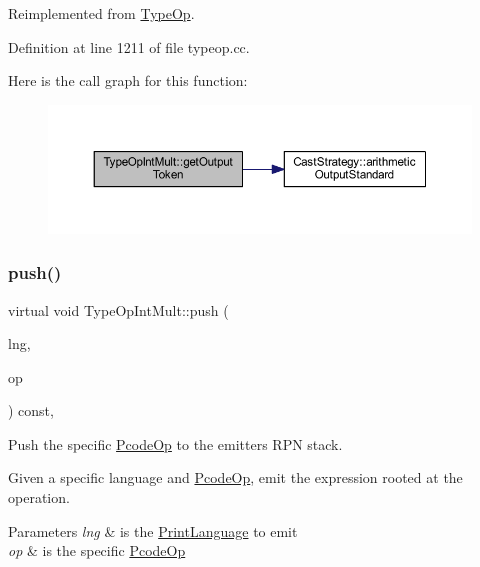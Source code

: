 Reimplemented from \mbox{\hyperlink{class_type_op_a7150ac93bb03a993735c829deb5237e7}{Type\+Op}}.



Definition at line 1211 of file typeop.\+cc.

Here is the call graph for this function\+:
\nopagebreak
\begin{figure}[H]
\begin{center}
\leavevmode
\includegraphics[width=350pt]{class_type_op_int_mult_abb986ab298da31068ac30163e6755e18_cgraph}
\end{center}
\end{figure}
\mbox{\label{class_type_op_int_mult_ab24769881d82e5db9d0ad5f91975cd4c}} 
\subsubsection{\texorpdfstring{push()}{push()}}
{\footnotesize\ttfamily virtual void Type\+Op\+Int\+Mult\+::push (\begin{DoxyParamCaption}\item[{\mbox{\hyperlink{class_print_language}{Print\+Language}} $\ast$}]{lng,  }\item[{const \mbox{\hyperlink{class_pcode_op}{Pcode\+Op}} $\ast$}]{op }\end{DoxyParamCaption}) const\hspace{0.3cm}{\ttfamily [inline]}, {\ttfamily [virtual]}}



Push the specific \mbox{\hyperlink{class_pcode_op}{Pcode\+Op}} to the emitter\textquotesingle{}s R\+PN stack. 

Given a specific language and \mbox{\hyperlink{class_pcode_op}{Pcode\+Op}}, emit the expression rooted at the operation. 
\begin{DoxyParams}{Parameters}
{\em lng} & is the \mbox{\hyperlink{class_print_language}{Print\+Language}} to emit \\
\hline
{\em op} & is the specific \mbox{\hyperlink{class_pcode_op}{Pcode\+Op}} \\
\hline
\end{DoxyParams}


